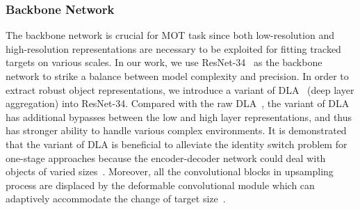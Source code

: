 \documentclass[acmsmall]{acmart}
\begin{document}
\subsubsection{Backbone Network} \label{sec:backbone}
The backbone network is crucial for MOT task since 
{both low-resolution and high-resolution representations are necessary to be exploited for fitting} tracked targets on various scales. 
{
In our work, we use ResNet-34~\cite{resnet} as the backbone network to strike a balance between model complexity and precision.
In order to extract robust object representations, we introduce a variant of DLA~\cite{point} (deep layer aggregation) into ResNet-34.
Compared with the raw DLA~\cite{dla}, the variant of DLA has additional bypasses between the low and high layer representations,
and thus has stronger ability to handle various complex environments.
It is demonstrated that the variant of DLA is beneficial to alleviate the identity switch problem for one-stage approaches because the encoder-decoder network could deal with objects of varied sizes~\cite{point,fairmot}.
Moreover, all the convolutional blocks in upsampling process are displaced by the deformable convolutional module which can adaptively accommodate the change of target size~\cite{deformable,zhou2020tracking}.
}


\end{document}
